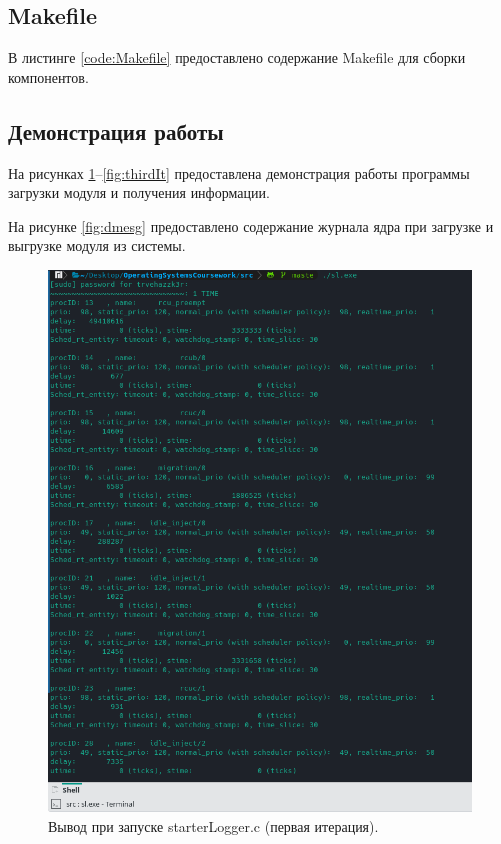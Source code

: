 \subsection{Makefile}
В листинге \ref{code:Makefile} предоставлено содержание Makefile для сборки компонентов.


\subsection{Демонстрация работы}
На рисунках \ref{fig:firstIt}--\ref{fig:thirdIt} предоставлена демонстрация работы программы загрузки модуля и получения информации.

На рисунке \ref{fig:dmesg} предоставлено содержание журнала ядра при загрузке и выгрузке модуля из системы.

\begin{figure}[H]
	\centering
	\includegraphics[scale=0.8]{img/firstIt.png}
	\caption{Вывод при запуске starterLogger.c (первая итерация). }
	\label{fig:firstIt}
\end{figure}

